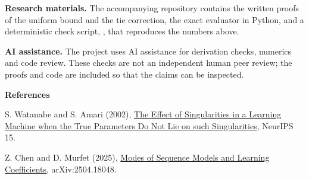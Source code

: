 \documentclass[11pt,a4paper]{article}
\begin{document}
\textbf{Research materials.} The accompanying repository contains the written proofs of the uniform bound and the tie correction, the exact evaluator in Python, and a deterministic check script, , that reproduces the numbers above.

\textbf{AI assistance.} The project uses AI assistance for derivation checks, numerics and code review. These checks are not an independent human peer review; the proofs and code are included so that the claims can be inspected.

\vspace{3pt}
{\small
\textbf{References}\par
S. Watanabe and S. Amari (2002), \href{https://proceedings.neurips.cc/paper_files/paper/2002/file/c2ba1bc54b239208cb37b901c0d3b363-Paper.pdf}{The Effect of Singularities in a Learning Machine when the True Parameters Do Not Lie on such Singularities}, NeurIPS 15.\par
Z. Chen and D. Murfet (2025), \href{https://arxiv.org/abs/2504.18048}{Modes of Sequence Models and Learning Coefficients}, arXiv:2504.18048.
}
\end{document}
